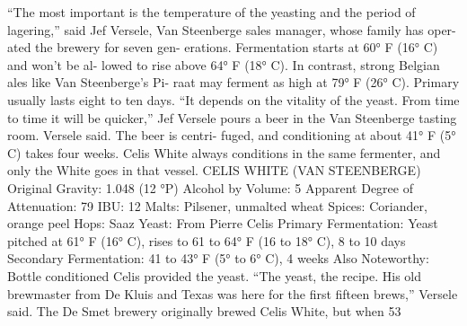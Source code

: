 \documentclass[a4paper,parskip=half]{scrartcl}
\begin{document}
“The most important is the
temperature of the yeasting and
the period of lagering,” said Jef
Versele, Van Steenberge sales
manager, whose family has oper-
ated the brewery for seven gen-
erations. Fermentation starts at
60° F (16° C) and won’t be al-
lowed to rise above 64° F (18°
C). In contrast, strong Belgian
ales like Van Steenberge’s Pi-
raat may ferment as high at 79°
F (26° C). Primary usually lasts
eight to ten days. “It depends on
the vitality of the yeast. From
time to time it will be quicker,”
Jef Versele pours a beer in the Van Steenberge tasting room.
Versele said. The beer is centri-
fuged, and conditioning at about 41° F (5° C) takes four weeks. Celis
White always conditions in the same fermenter, and only the White
goes in that vessel.
CELIS WHITE (VAN STEENBERGE)
Original Gravity: 1.048 (12 °P)
Alcohol by Volume: 5%
Apparent Degree of Attenuation: 79%
IBU: 12
Malts: Pilsener, unmalted wheat
Spices: Coriander, orange peel
Hops: Saaz
Yeast: From Pierre Celis
Primary Fermentation: Yeast pitched at 61° F (16° C), rises to 61 to 64° F (16
to 18° C), 8 to 10 days
Secondary Fermentation: 41 to 43° F (5° to 6° C), 4 weeks
Also Noteworthy: Bottle conditioned
Celis provided the yeast. “The yeast, the recipe. His old brewmaster
from De Kluis and Texas was here for the first fifteen brews,” Versele
said. The De Smet brewery originally brewed Celis White, but when
53

\parencite[53]{Hieronymus2010}
\end{document}
